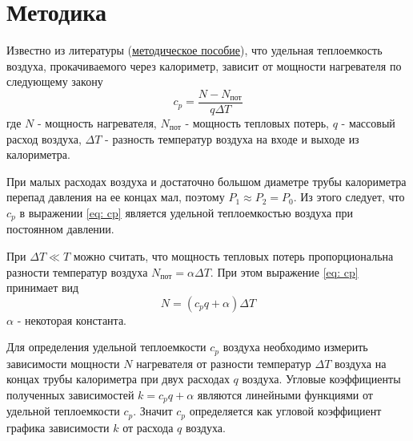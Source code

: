 \section{Методика}

Известно из литературы (\href{https://old.mipt.ru/education/chair/physics/S_II/lab/211.pdf}{методическое пособие}), что удельная теплоемкость воздуха, прокачиваемого через калориметр, зависит от мощности нагревателя по следующему закону
\begin{equation}
    c_p = \frac{N - N_\text{пот}}{q\Delta T} \label{eq: cp}
\end{equation}
где $N$ - мощность нагревателя, $N_\text{пот}$ - мощность тепловых потерь, $q$ - массовый расход воздуха, $\Delta T$ - разность температур воздуха на входе и выходе из калориметра.

При малых расходах воздуха и достаточно большом диаметре трубы калориметра перепад давления на ее концах мал, поэтому $P_1 \approx P_2 = P_0$. Из этого следует, что $c_p$ в выражении \eqref{eq: cp} является удельной теплоемкостью воздуха при постоянном давлении.

При $\Delta T \ll T$ можно считать, что мощность тепловых потерь пропорциональна разности температур воздуха $N_\text{пот} = \alpha \Delta T$. При этом выражение \eqref{eq: cp} принимает вид
\begin{equation}
    N = (c_p q + \alpha)\Delta T \label{eq: N(delta T)}
\end{equation}
$\alpha$ - некоторая константа.


Для определения удельной теплоемкости $c_p$ воздуха необходимо измерить зависимости мощности $N$ нагревателя от разности температур $\Delta T$ воздуха на концах трубы калориметра при двух расходах $q$ воздуха. Угловые коэффициенты полученных зависимостей $k = c_p q + \alpha$ являются линейными функциями от удельной теплоемкости $c_p$. Значит $c_p$ определяется как угловой коэффициент графика зависимости $k$ от расхода $q$ воздуха. 